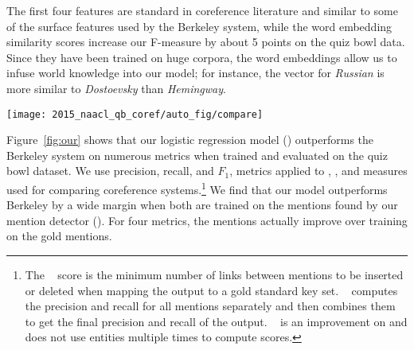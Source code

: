 The first four features are standard in coreference literature and similar to
some of the surface features used by the Berkeley system, while the word
embedding similarity scores increase our F-measure by about 5 points on the quiz
bowl data. Since they have been trained on huge corpora, the word embeddings
allow us to infuse world knowledge into our model; for instance, the vector for
\emph{Russian} is more similar to \emph{Dostoevsky} than \emph{Hemingway}.

\begin{figure*}[t!]
  \centering
  \texttt{[image: 2015\_naacl\_qb\_coref/auto\_fig/compare]}
  \caption{All models are trained and evaluated on quiz bowl data via five fold
    cross validation on $F_1$, precision, and recall. Berkeley//Gold refers
    to the mention detection used,  refers to our logistic regression
    model and \emph{QB Final} refers to the Berkeley model trained on quiz bowl
    data. Our model outperforms the Berkeley model on every metric when using
    our detected  mentions. When given gold mentions, 
    outperforms Berkeley \emph{QB Final} in five of nine metrics.}
  \label{fig:our}
\end{figure*}

Figure~\ref{fig:our} shows that our logistic regression model ()
outperforms the Berkeley system on numerous metrics when trained and evaluated
on the quiz bowl dataset. We use precision, recall, and $F_1$, metrics applied
to , , and  measures used for comparing
coreference systems.\footnote{The ~\cite{vilain1995model} score is the
  minimum number of links between mentions to be inserted or deleted when
  mapping the output to a gold standard key set.
  ~\cite{bagga1998algorithms} computes the precision and recall for
  all mentions separately and then combines them to get the final precision and
  recall of the output. ~\cite{luo2005coreference} is an improvement
  on  and does not use entities multiple times to compute scores.} We
find that our  model outperforms Berkeley by a wide margin when both are
trained on the mentions found by our mention detector (). For four
metrics, the  mentions actually improve over training on the gold
mentions.


